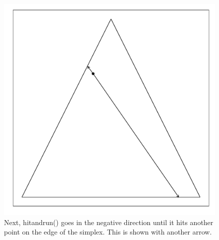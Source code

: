 \documentclass{article}\usepackage{graphicx, color}
\makeatletter
\def\maxwidth{ %
  \ifdim\Gin@nat@width>\linewidth
    \linewidth
  \else
    \Gin@nat@width
  \fi
}
\newenvironment{knitrout}{}{} %
\makeatother
\begin{document}
\begin{figure}[H]
\begin{knitrout}
\color{fgcolor}
\includegraphics[width=\maxwidth]{figure/hitandrun_walkthrough4} 

\end{knitrout}

\caption{Next, hitandrun() goes in the negative direction until it hits another point on the edge of the simplex. This is shown with another arrow.}
\end{figure}
\end{document}
